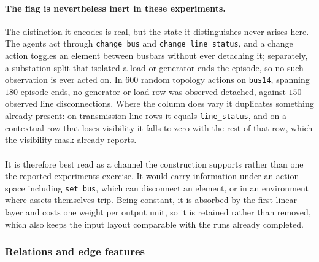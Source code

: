 {\paragraph{The flag is nevertheless inert in these experiments.}
The distinction it encodes is real, but the state it distinguishes never arises
here. The agents act through \texttt{change\_bus} and
\texttt{change\_line\_status}, and a change action toggles an element between
busbars without ever detaching it; separately, a substation split that isolated
a load or generator ends the episode, so no such observation is ever acted on.
In $600$ random topology actions on \texttt{bus14}, spanning $180$ episode ends,
no generator or load row was observed detached, against $150$ observed line
disconnections. Where the column does vary it duplicates something already
present: on transmission-line rows it equals \texttt{line\_status}, and on a
contextual row that loses visibility it falls to zero with the rest of that row,
which the visibility mask already reports.
\\
\\
It is therefore best read as a channel the construction supports rather than one
the reported experiments exercise. It would carry information under an action
space including \texttt{set\_bus}, which can disconnect an element, or in an
environment where assets themselves trip. Being constant, it is absorbed by the
first linear layer and costs one weight per output unit, so it is retained
rather than removed, which also keeps the input layout comparable with the runs
already completed.
}

\subsubsection{Relations and edge features}
\label{subsec:heterogeneous-relations}

